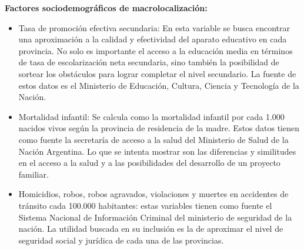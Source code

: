 \documentclass[12pt,a4paper]{article}
\begin{document}
\textbf{Factores sociodemográficos de macrolocalización:}
\begin{itemize}

\item Tasa de promoción efectiva secundaria: En esta variable se busca encontrar una aproximación a la calidad y efectividad del aparato educativo en cada provincia. No solo es importante el acceso a la educación media en términos de tasa de escolarización neta secundaria, sino también la posibilidad de sortear los obstáculos para lograr completar el nivel secundario. La fuente de estos datos es el Ministerio de Educación, Cultura, Ciencia y Tecnología de la Nación.

\item Mortalidad infantil: Se calcula como la mortalidad infantil por cada 1.000 nacidos vivos según la provincia de residencia de la madre. Estos datos tienen como fuente la secretaría de acceso a la salud del Ministerio de Salud de la Nación Argentina. Lo que se intenta mostrar son las diferencias y similitudes en el acceso a la salud y a las posibilidades del desarrollo de un proyecto familiar.

\item Homicidios, robos, robos agravados, violaciones y muertes en accidentes de tránsito cada 100.000 habitantes: estas variables tienen como fuente el Sistema Nacional de Información Criminal del ministerio de seguridad de la nación. La utilidad buscada en su inclusión es la de aproximar el nivel de seguridad social y jurídica de cada una de las provincias.
\end{itemize}
\end{document}
